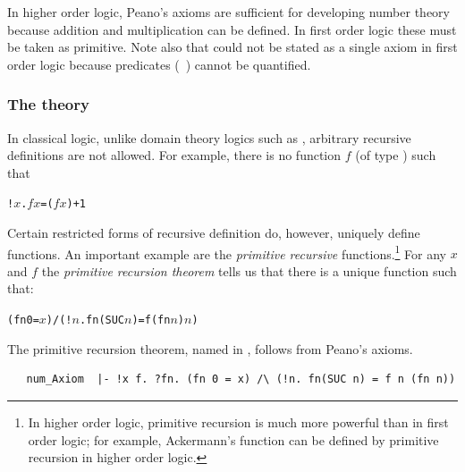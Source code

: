 In higher order logic, Peano's axioms are sufficient for developing
number theory because addition and multiplication can be defined. In
first order logic these must be taken as primitive.  Note also that
 could not be stated as a single axiom in first order
logic because predicates (\eg\ ) cannot be quantified.

\subsubsection{The theory }
\label{prim_rec}

In classical logic, unlike domain theory logics such as \PPL,
%
%
arbitrary recursive definitions
%
%
are not allowed. For example, there is no function $f$ (of type
) such that

\begin{alltt}
   !\(x\). \(f\) \(x\) = (\(f\) \(x\)) + 1
\end{alltt}
Certain restricted forms of recursive
%
%
definition do, however, uniquely define functions. An important
example are the \emph{primitive recursive} functions.\footnote{In
  higher order logic, primitive recursion is much more powerful than
  in first order logic; for example, Ackermann's function can be
  defined by primitive recursion in higher order logic.} For any $x$
and $f$ the \emph{primitive recursion theorem} tells us that there is
a unique function  such that:

\begin{alltt}
   (fn 0 = \(x\)) /\bs (!\(n\). fn(SUC \(n\)) = f (fn \(n\)) \(n\))
\end{alltt}

The primitive recursion theorem, named  in \HOL,
follows from Peano's
%
%
axioms.

\begin{hol}
\begin{verbatim}
   num_Axiom  |- !x f. ?fn. (fn 0 = x) /\ (!n. fn(SUC n) = f n (fn n))
\end{verbatim}
\end{hol}

